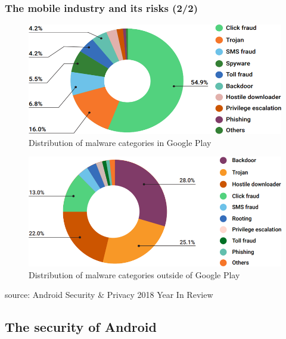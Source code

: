 \begin{frame}
    \frametitle{The mobile industry and its risks (2/2)}
    \centering

    \begin{figure}[!ht]
        \includegraphics[height=0.32\textheight]{figures/introduction/categories/play.png}
        \caption{\scriptsize{Distribution of malware categories in Google Play}}
    \end{figure}

    \vspace{-20pt}

    \begin{figure}[!ht]
        \includegraphics[height=0.32\textheight]{figures/introduction/categories/others.png}
        \caption{\scriptsize{Distribution of malware categories outside of Google Play}}
    \end{figure}

    \vspace{-10pt}

    \scriptsize{source: Android Security \& Privacy 2018 Year In Review}

\end{frame}

\subsection[Android security]{The security of Android}

